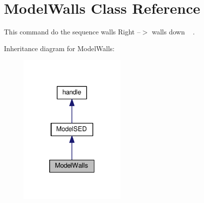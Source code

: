 \hypertarget{class_model_walls}{}\section{Model\+Walls Class Reference}
\label{class_model_walls}


This command do the sequence walls Right --$>$ walls down ~\newline
.  




Inheritance diagram for Model\+Walls\+:\nopagebreak
\begin{figure}[H]
\begin{center}
\leavevmode
\includegraphics[width=148pt]{class_model_walls__inherit__graph}
\end{center}
\end{figure}
